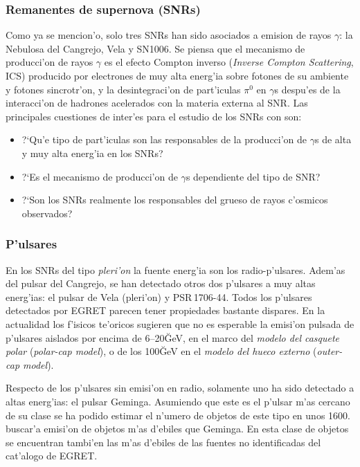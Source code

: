 \subsubsection*{Remanentes de supernova (SNRs)}
% 
Como ya se mencion'o, solo tres SNRs han sido asociados a emision de
rayos $\gamma$: la Nebulosa del Cangrejo, Vela y SN1006. Se piensa que
el mecanismo de producci'on de rayos $\gamma$ es el efecto Compton
inverso (\emph{Inverse Compton Scattering}, ICS) producido por
electrones de muy alta energ'ia sobre fotones de su ambiente y fotones
sincrotr'on, y la desintegraci'on de part'iculas $\pi^0$ en $\gamma$s
despu'es de la interacci'on de hadrones acelerados con la materia
externa al SNR. Las principales cuestiones de inter'es para el estudio
de los SNRs con \MAGIC son:
%
\begin{itemize}
\item ?`Qu'e tipo de part'iculas son las responsables de la
  producci'on de $\gamma$s de alta y muy alta energ'ia en los SNRs?
\item ?`Es el mecanismo de producci'on de $\gamma$s dependiente del
  tipo de SNR?
\item ?`Son los SNRs realmente los responsables del grueso de rayos
  c'osmicos observados?
\end{itemize}

\subsubsection*{P'ulsares} 
%
En los SNRs del tipo \emph{pleri'on} la fuente energ'ia son los
radio-p'ulsares. Adem'as del pulsar del Cangrejo, se han detectado
otros dos p'ulsares a muy altas energ'ias: el pulsar de Vela
(pleri'on) y PSR\,1706-44. Todos los p'ulsares detectados por EGRET
parecen tener propiedades bastante dispares. En la actualidad los
f'isicos te'oricos sugieren que no es esperable la emisi'on pulsada de
p'ulsares aislados por encima de 6--20\u{GeV}, en el marco del
\emph{modelo del casquete polar} (\emph{polar-cap model}), o de los
100\u{GeV} en el \emph{modelo del hueco externo} (\emph{outer-cap
model}). 

Respecto de los p'ulsares sin emisi'on en radio, solamente uno ha sido
detectado a altas energ'ias: el pulsar Geminga. Asumiendo que este es
el p'ulsar m'as cercano de su clase se ha podido estimar el n'umero
de objetos de este tipo en unos 1600. \MAGIC buscar'a emisi'on de
objetos m'as d'ebiles que Geminga. En esta clase de objetos se
encuentran tambi'en las m'as d'ebiles de las fuentes no identificadas
del cat'alogo de EGRET.

